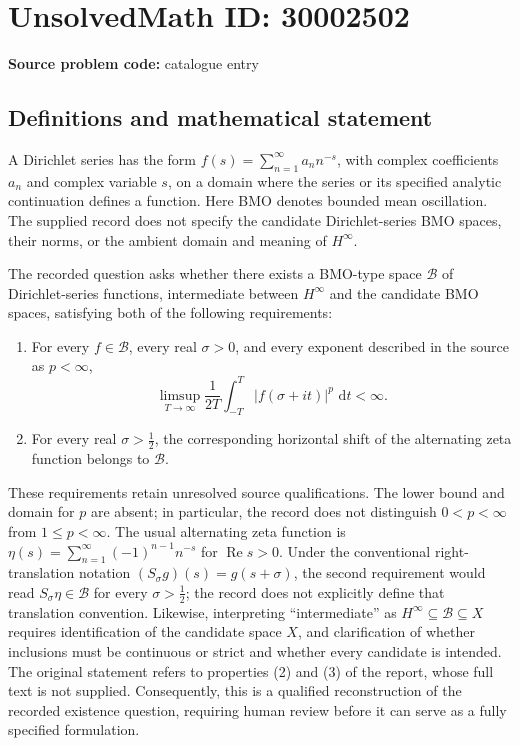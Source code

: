 \documentclass[11pt]{article}
\newcommand{\dd}{\,\mathrm{d}}
\begin{document}
\section*{UnsolvedMath ID: 30002502}
\textbf{Source problem code:} catalogue entry
\subsection{Definitions and mathematical statement}
A Dirichlet series has the form \(f(s)=\sum_{n=1}^{\infty}a_n n^{-s}\), with complex coefficients \(a_n\) and complex variable \(s\), on a domain where the series or its specified analytic continuation defines a function. Here BMO denotes bounded mean oscillation. The supplied record does not specify the candidate Dirichlet-series BMO spaces, their norms, or the ambient domain and meaning of \(H^\infty\).

The recorded question asks whether there exists a BMO-type space \(\mathcal B\) of Dirichlet-series functions, intermediate between \(H^\infty\) and the candidate BMO spaces, satisfying both of the following requirements:
\begin{enumerate}
\item For every \(f\in\mathcal B\), every real \(\sigma>0\), and every exponent described in the source as \(p<\infty\),
\[
\limsup_{T\to\infty}\frac{1}{2T}\int_{-T}^{T}|f(\sigma+it)|^p\,\dd t<\infty.
\]
\item For every real \(\sigma>\tfrac12\), the corresponding horizontal shift of the alternating zeta function belongs to \(\mathcal B\).
\end{enumerate}

These requirements retain unresolved source qualifications. The lower bound and domain for \(p\) are absent; in particular, the record does not distinguish \(0<p<\infty\) from \(1\le p<\infty\). The usual alternating zeta function is \(\eta(s)=\sum_{n=1}^{\infty}(-1)^{n-1}n^{-s}\) for \(\operatorname{Re}s>0\). Under the conventional right-translation notation \((S_\sigma g)(s)=g(s+\sigma)\), the second requirement would read \(S_\sigma\eta\in\mathcal B\) for every \(\sigma>\tfrac12\); the record does not explicitly define that translation convention. Likewise, interpreting ``intermediate'' as \(H^\infty\subseteq\mathcal B\subseteq X\) requires identification of the candidate space \(X\), and clarification of whether inclusions must be continuous or strict and whether every candidate is intended. The original statement refers to properties (2) and (3) of the report, whose full text is not supplied. Consequently, this is a qualified reconstruction of the recorded existence question, requiring human review before it can serve as a fully specified formulation.
\end{document}
